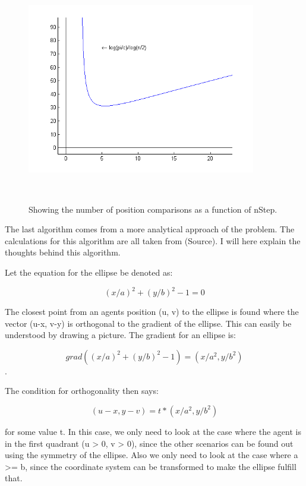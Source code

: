 \documentclass[paper=a4, fontsize=11pt,twoside]{scrartcl}		%
\begin{document}
\begin{flushleft}
\begin{figure}
\begin{center}
\includegraphics[height=10cm,width=10cm]{recursiveFunctionPlot}
\caption{Showing the number of position comparisons as a function of nStep.}
\label{fig:recursiveFunction}
\end{center}
\end{figure}

The last algorithm comes from a more analytical approach of the problem. The calculations for this algorithm are all taken from (Source). I will here explain the thoughts behind this algorithm. \newline

Let the equation for the ellipse be denoted as:

$$(x/a)^2 + (y/b)^2 - 1 = 0$$

The closest point from an agents position (u, v)  to the ellipse is found where the vector (u-x, v-y) is orthogonal to the gradient of the ellipse. This can easily be understood by drawing a picture. The gradient for an ellipse is:

$$grad((x/a)^2 + (y/b)^2 - 1) = (x/a^2, y/b^2)$$.

The condition for orthogonality then says:

$$(u-x, y-v) = t*(x/a^2, y/b^2)$$

for some value t. In this case, we only need to look at the case where the agent is in the first quadrant (u > 0, v > 0), since the other scenarios can be found out using the symmetry of the ellipse. Also we only need to look at the case where a >= b, since the coordinate system can be transformed to make the ellipse fulfill that. \newline


\end{flushleft}
\end{document}
